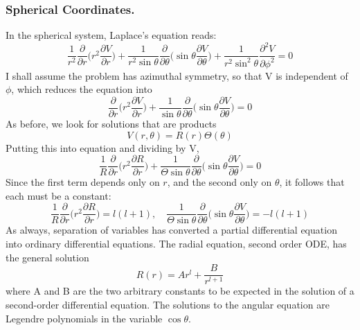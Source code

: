 \documentclass[../../../main.tex]{subfiles}
\begin{document}
\subsubsection{Spherical Coordinates.} In the spherical system, Laplace's equation reads:
\begin{equation*}
    \frac{1}{r^2}\frac{\partial}{\partial r}\biggl(r^2\frac{\partial V}{\partial r}\biggr)+\frac{1}{r^2\sin\theta}\frac{\partial}{\partial \theta}\biggl(\sin\theta\frac{\partial V}{\partial \theta}\biggr)+\frac{1}{r^2\sin^2\theta}\frac{\partial^2 V}{\partial \phi^2}=0
\end{equation*}
I shall assume the problem has azimuthal symmetry, so that V is independent of $\phi$, which reduces the equation into
\begin{equation*}
    \frac{\partial}{\partial r}\biggl(r^2\frac{\partial V}{\partial r}\biggr)+\frac{1}{\sin\theta}\frac{\partial}{\partial \theta}\biggl(\sin\theta\frac{\partial V}{\partial \theta}\biggr)=0
\end{equation*}
As before, we look for solutions that are products
\begin{equation*}
    V (r, \theta) = R(r) \Theta(\theta)
\end{equation*}
Putting this into equation and dividing by V,
\begin{equation*}
    \frac{1}{R}\frac{\partial}{\partial r}\biggl(r^2\frac{\partial R}{\partial r}\biggr)+\frac{1}{\Theta\sin\theta}\frac{\partial}{\partial \theta}\biggl(\sin\theta\frac{\partial V}{\partial \theta}\biggr)=0
\end{equation*}
Since the first term depends only on $r$, and the second only on $\theta$, it follows that each must be a constant:
\begin{equation*}
    \frac{1}{R}\frac{\partial}{\partial r}\biggl(r^2\frac{\partial R}{\partial r}\biggr)=l(l+1),\quad \frac{1}{\Theta\sin\theta}\frac{\partial}{\partial \theta}\biggl(\sin\theta\frac{\partial V}{\partial \theta}\biggr)=-l(l+1)
\end{equation*}
As always, separation of variables has converted a partial differential equation into ordinary differential equations. The radial equation, second order ODE, has the general solution
\begin{equation*}
    R(r)=Ar^l+\frac{B}{r^{l+1}}
\end{equation*}
where A and B are the two arbitrary constants to be expected in the solution of a second-order differential equation. The solutions to the angular equation are Legendre polynomials in the variable $\cos \theta$.
\end{document}
